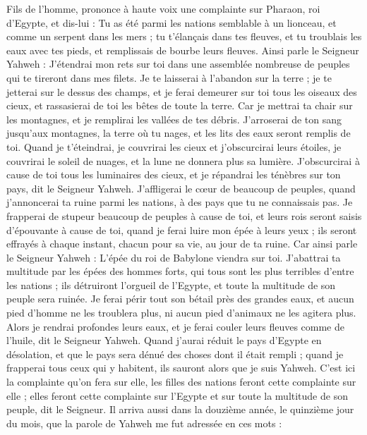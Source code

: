 \begin{multicols}{2}
Fils de l’homme, prononce à haute voix une complainte sur Pharaon, roi d'Egypte, et dis-lui : Tu as été parmi les nations semblable à un lionceau, et comme un serpent dans les mers ; tu t'élançais dans tes fleuves, et tu troublais les eaux avec tes pieds, et remplissais de bourbe leurs fleuves.
Ainsi parle le Seigneur Yahweh : J'étendrai mon rets sur toi dans une assemblée nombreuse de peuples qui te tireront dans mes filets.
Je te laisserai à l'abandon sur la terre ; je te jetterai sur le dessus des champs, et je ferai demeurer sur toi tous les oiseaux des cieux, et rassasierai de toi les bêtes de toute la terre.
Car je mettrai ta chair sur les montagnes, et je remplirai les vallées de tes débris.
J'arroserai de ton sang jusqu’aux montagnes, la terre où tu nages, et les lits des eaux seront remplis de toi.
Quand je t’éteindrai, je couvrirai les cieux et j’obscurcirai leurs étoiles, je couvrirai le soleil de nuages, et la lune ne donnera plus sa lumière\FTNT{}.
J’obscurcirai à cause de toi tous les luminaires des cieux, et je répandrai les ténèbres sur ton pays, dit le Seigneur Yahweh.
J’affligerai le cœur de beaucoup de peuples, quand j’annoncerai ta ruine parmi les nations, à des pays que tu ne connaissais pas.
Je frapperai de stupeur beaucoup de peuples à cause de toi, et leurs rois seront saisis d’épouvante à cause de toi, quand je ferai luire mon épée à leurs yeux ; ils seront effrayés à chaque instant, chacun pour sa vie, au jour de ta ruine.
Car ainsi parle le Seigneur Yahweh : L'épée du roi de Babylone viendra sur toi.
J'abattrai ta multitude par les épées des hommes forts, qui tous sont les plus terribles d'entre les nations ; ils détruiront l'orgueil de l'Egypte, et toute la multitude de son peuple sera ruinée.
Je ferai périr tout son bétail près des grandes eaux, et aucun pied d'homme ne les troublera plus, ni aucun pied d’animaux ne les agitera plus.
Alors je rendrai profondes leurs eaux, et je ferai couler leurs fleuves comme de l'huile, dit le Seigneur Yahweh.
Quand j'aurai réduit le pays d'Egypte en désolation, et que le pays sera dénué des choses dont il était rempli ; quand je frapperai tous ceux qui y habitent, ils sauront alors que je suis Yahweh.
C'est ici la complainte qu'on fera sur elle, les filles des nations feront cette complainte sur elle ; elles feront cette complainte sur l'Egypte et sur toute la multitude de son peuple, dit le Seigneur.
Il arriva aussi dans la douzième année, le quinzième jour du mois, que la parole de Yahweh me fut adressée en ces mots :

\end{multicols}
